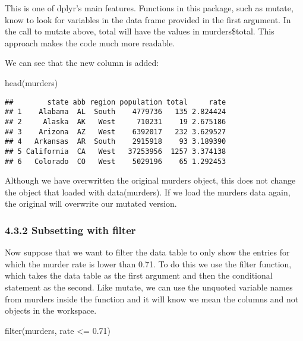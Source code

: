 \documentclass[
]{article}
\newenvironment{Shaded}{\begin{snugshade}}{\end{snugshade}}
\newcommand{\FloatTok}[1]{\textcolor[rgb]{0.00,0.00,0.81}{#1}}
\newcommand{\FunctionTok}[1]{\textcolor[rgb]{0.00,0.00,0.00}{#1}}
\newcommand{\NormalTok}[1]{#1}
\newcommand{\SpecialCharTok}[1]{\textcolor[rgb]{0.00,0.00,0.00}{#1}}
\begin{document}
This is one of dplyr's main features. Functions in this package, such as
mutate, know to look for variables in the data frame provided in the
first argument. In the call to mutate above, total will have the values
in murders\$total. This approach makes the code much more readable.

We can see that the new column is added:

\begin{Shaded}
\begin{Highlighting}[]
\FunctionTok{head}\NormalTok{(murders)}
\end{Highlighting}
\end{Shaded}

\begin{verbatim}
##        state abb region population total     rate
## 1    Alabama  AL  South    4779736   135 2.824424
## 2     Alaska  AK   West     710231    19 2.675186
## 3    Arizona  AZ   West    6392017   232 3.629527
## 4   Arkansas  AR  South    2915918    93 3.189390
## 5 California  CA   West   37253956  1257 3.374138
## 6   Colorado  CO   West    5029196    65 1.292453
\end{verbatim}

Although we have overwritten the original murders object, this does not
change the object that loaded with data(murders). If we load the murders
data again, the original will overwrite our mutated version.

\hypertarget{subsetting-with-filter}{%
\subsubsection{4.3.2 Subsetting with
filter}\label{subsetting-with-filter}}

Now suppose that we want to filter the data table to only show the
entries for which the murder rate is lower than 0.71. To do this we use
the filter function, which takes the data table as the first argument
and then the conditional statement as the second. Like mutate, we can
use the unquoted variable names from murders inside the function and it
will know we mean the columns and not objects in the workspace.

\begin{Shaded}
\begin{Highlighting}[]
\FunctionTok{filter}\NormalTok{(murders, rate }\SpecialCharTok{\textless{}=} \FloatTok{0.71}\NormalTok{)}
\end{Highlighting}
\end{Shaded}
\end{document}
